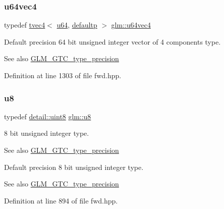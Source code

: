 \subsubsection{\texorpdfstring{u64vec4}{u64vec4}}
{\footnotesize\ttfamily typedef \mbox{\hyperlink{structglm_1_1tvec4}{tvec4}}$<$ \mbox{\hyperlink{group__gtc__type__precision_ga71cedd4972f9cb1a5e14dfe5ab83ecd7}{u64}}, \mbox{\hyperlink{namespaceglm_a0f04f086094c747d227af4425893f545a9d21ccd8b5a009ec7eb7677befc3bf51}{defaultp}} $>$ \mbox{\hyperlink{group__gtc__type__precision_gadafdefd5524bf6a48bb7c47edb787ae5}{glm\+::u64vec4}}}

Default precision 64 bit unsigned integer vector of 4 components type. \begin{DoxySeeAlso}{See also}
\mbox{\hyperlink{group__gtc__type__precision}{G\+L\+M\+\_\+\+G\+T\+C\+\_\+type\+\_\+precision}} 
\end{DoxySeeAlso}


Definition at line 1303 of file fwd.\+hpp.

\mbox{\label{group__gtc__type__precision_ga5e3dc67373d5068997d2d9f41c9024d2}} 
\subsubsection{\texorpdfstring{u8}{u8}}
{\footnotesize\ttfamily typedef \mbox{\hyperlink{namespaceglm_1_1detail_aef2588f97d090cc19fbbe0c74fe17c8f}{detail\+::uint8}} \mbox{\hyperlink{group__gtc__type__precision_ga5e3dc67373d5068997d2d9f41c9024d2}{glm\+::u8}}}

8 bit unsigned integer type. \begin{DoxySeeAlso}{See also}
\mbox{\hyperlink{group__gtc__type__precision}{G\+L\+M\+\_\+\+G\+T\+C\+\_\+type\+\_\+precision}}
\end{DoxySeeAlso}
Default precision 8 bit unsigned integer type. \begin{DoxySeeAlso}{See also}
\mbox{\hyperlink{group__gtc__type__precision}{G\+L\+M\+\_\+\+G\+T\+C\+\_\+type\+\_\+precision}} 
\end{DoxySeeAlso}


Definition at line 894 of file fwd.\+hpp.

\mbox{\label{group__gtc__type__precision_ga024be724ff45865952190522b03fc0d5}} 
